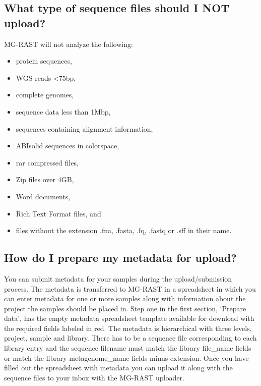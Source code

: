 \documentclass[12pt,fullpage]{report}
\begin{document}
\subsection*{What type of sequence files should I NOT upload?}
MG-RAST will not analyze the following:
\begin{itemize}
\item  protein sequences,
\item  WGS reads \textless  75bp,
\item  complete genomes,
\item  sequence data less than 1Mbp,
\item  sequences containing alignment information,
\item  ABIsolid sequences in colorspace,
\item  rar compressed files,
\item  Zip files over 4GB,
\item  Word documents,
\item  Rich Text Format files, and
\item  files without the extension .fna, .fasta, .fq, .fastq or .sff in their name.
\end{itemize}
\subsection*{How do I prepare my metadata for upload?}
You can submit metadata for your samples during the upload/submission process. The metadata is transferred to MG-RAST in a spreadsheet in which you can enter metadata for one or more samples along with information about the project the samples should be placed in. Step one in the first section, `Prepare data', has the empty metadata spreadsheet template available for download with the required fields labeled in red. The metadata is hierarchical with three levels, project, sample and library. There has to be a sequence file corresponding to each library entry and the sequence filename must match the library file\_name fields or match the library metagenome\_name fields minus extension. Once you have filled out the spreadsheet with metadata you can upload it along with the sequence files to your inbox with the MG-RAST uploader.
\end{document}
